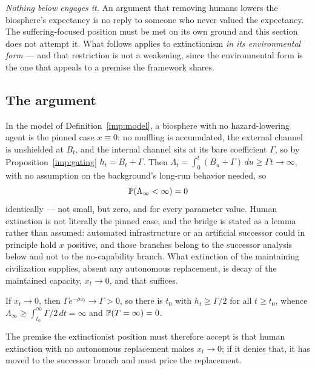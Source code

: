 \emph{Nothing below engages it.} An argument that removing humans lowers
the biosphere's expectancy is no reply to someone who never valued the
expectancy. The suffering-focused position must be met on its own ground
and this section does not attempt it. What follows applies to
extinctionism \emph{in its environmental form} --- and that restriction
is not a weakening, since the environmental form is the one that appeals
to a premise the framework shares.

\subsection{The argument}\label{hr:subsub:extinctionargument}

\begin{proposition}\label{hr:prop:extinction}
In the model of Definition~\ref{imp:model}, a biosphere with no hazard-lowering
agent is the pinned case $x\equiv0$: no muffling is accumulated, the
external channel is unshielded at $B_t$, and the internal channel sits
at its bare coefficient $\Gamma$, so by Proposition~\ref{imp:gating}
$h_t=B_t+\Gamma$. Then $\Lambda_t=\int_0^t(B_u+\Gamma)\,du\ge\Gamma t\to\infty$,
with no assumption on the background's long-run behavior needed, so
\[
\mathbb{P}(\Lambda_\infty<\infty)=0
\]
identically --- not small, but zero, and for every parameter value.
Human extinction is not literally the pinned case, and the bridge is
stated as a lemma rather than assumed: automated infrastructure or an
artificial successor could in principle hold $x$ positive, and those
branches belong to the successor analysis below and not to the
no-capability branch. What extinction of the maintaining civilization
supplies, absent any autonomous replacement, is decay of the maintained
capacity, $x_t\to0$, and that suffices.

\begin{lemma}
\label{hr:lem:decay}
If $x_t\to0$, then $\Gamma e^{-\rho x_t}\to\Gamma>0$, so there is $t_0$
with $h_t\ge\Gamma/2$ for all $t\ge t_0$, whence
$\Lambda_\infty\ge\int_{t_0}^\infty\Gamma/2\,dt=\infty$ and $\mathbb{P}(T=\infty)=0$.
\end{lemma}

\noindent The premise the extinctionist position must therefore
accept is that human extinction with no autonomous replacement makes
$x_t\to0$; if it denies that, it has moved to the successor branch and
must price the replacement.


\end{proposition}
